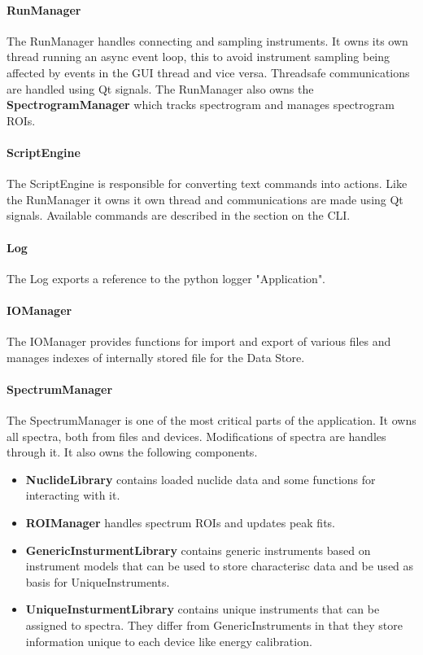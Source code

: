 \paragraph{RunManager} 
The RunManager handles connecting and sampling instruments. It owns its own thread running an async event loop, this to avoid instrument sampling being affected by events in the GUI thread and vice versa. Threadsafe communications are handled using Qt signals. The RunManager also owns the \textbf{SpectrogramManager} which tracks spectrogram and manages spectrogram ROIs.
\paragraph{ScriptEngine} 
The ScriptEngine is responsible for converting text commands into actions. Like the RunManager it owns it own thread and communications are made using Qt signals. Available commands are described in the section on the CLI. 
\paragraph{Log} The Log exports a reference to the python logger "Application".
\paragraph{IOManager} The IOManager provides functions for import and export of various files and manages indexes of internally stored file for the Data Store.
\paragraph{SpectrumManager} The SpectrumManager is one of the most critical parts of the application. It owns all spectra, both from files and devices. Modifications of spectra are handles through it. It also owns the following components.
\begin{itemize}
    \item \textbf{NuclideLibrary} contains loaded nuclide data and some functions for interacting with it.
    \item \textbf{ROIManager} handles spectrum ROIs and updates peak fits.
    \item \textbf{GenericInsturmentLibrary} contains generic instruments based on instrument models that can be used to store characterisc data and be used as basis for UniqueInstruments.
    \item \textbf{UniqueInsturmentLibrary} contains unique instruments that can be assigned to spectra. They differ from GenericInstruments in that they store information unique to each device like energy calibration.
\end{itemize}

